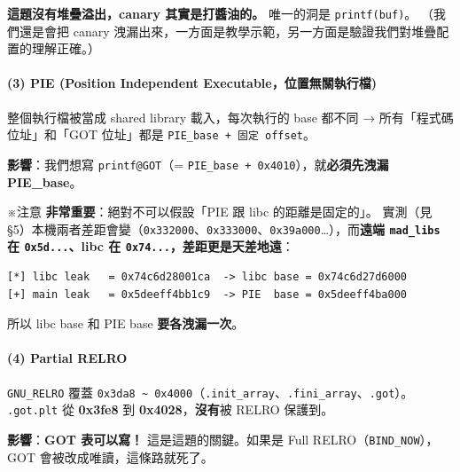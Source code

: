 \documentclass[10pt,a4paper]{article}
\renewenvironment{quote}{%
  \begin{mdframed}[linewidth=0pt,innerleftmargin=0pt,innerrightmargin=0pt,
    innerbottommargin=0pt,innertopmargin=0pt,skipabove=0.55em,skipbelow=0.55em,
    leftmargin=0.9em,rightmargin=0.4em,startcode={\color{quotebar}\vrule width 2.6pt},%
    endcode={}]%
  \itshape\color{black}%
}{%
  \end{mdframed}%
}
\begin{document}
\begin{quote}
\textbf{這題沒有堆疊溢出，canary 其實是打醬油的。} 唯一的洞是
\texttt{printf(buf)}。 （我們還是會把 canary
洩漏出來，一方面是教學示範，另一方面是驗證我們對堆疊配置的理解正確。）
\end{quote}

\paragraph{(3) PIE (Position Independent
Executable，位置無關執行檔)}\label{pie-position-independent-executableux4f4dux7f6eux7121ux95dcux57f7ux884cux6a94}

整個執行檔被當成 shared library 載入，每次執行的 base 都不同 →
所有「程式碼位址」和「GOT 位址」都是
\texttt{PIE\_\allowbreak{}base\ \allowbreak{}+\ \allowbreak{}固定\ \allowbreak{}offset}。

\textbf{影響}：我們想寫 \texttt{printf@GOT}（=
\texttt{PIE\_\allowbreak{}base\ \allowbreak{}+\ \allowbreak{}0x4010}），就\textbf{必須先洩漏 PIE\_base}。

※注意 \textbf{非常重要}：絕對不可以假設「PIE 跟 libc 的距離是固定的」。
實測（見
§5）本機兩者差距會變（\texttt{0x332000}、\texttt{0x333000}、\texttt{0x39a000}\ldots），而\textbf{遠端
\texttt{mad\_\allowbreak{}libs} 在 \texttt{0x5d...}、libc 在
\texttt{0x74...}，差距更是天差地遠}：

\begin{Verbatim}[breaklines=true,breakanywhere=true,breakautoindent=false,fontsize=\fontsize{7.0}{9.5}\selectfont]
[*] libc leak   = 0x74c6d28001ca  -> libc base = 0x74c6d27d6000
[+] main leak   = 0x5deeff4bb1c9  -> PIE  base = 0x5deeff4ba000
\end{Verbatim}

所以 libc base 和 PIE base \textbf{要各洩漏一次}。

\paragraph{(4) Partial RELRO}\label{partial-relro}

\texttt{GNU\_\allowbreak{}RELRO} 覆蓋
\texttt{0x3da8\ \allowbreak{}\textasciitilde{}\allowbreak{}\ \allowbreak{}0x4000}（\texttt{.\allowbreak{}init\_\allowbreak{}array}、\texttt{.\allowbreak{}fini\_\allowbreak{}array}、\texttt{.\allowbreak{}got}）。
\texttt{.\allowbreak{}got.\allowbreak{}plt} 從 \textbf{0x3fe8} 到 \textbf{0x4028}，\textbf{沒有}被
RELRO 保護到。

\textbf{影響}：\textbf{GOT 表可以寫！} 這是這題的關鍵。如果是 Full
RELRO（\texttt{BIND\_\allowbreak{}NOW}），GOT 會被改成唯讀，這條路就死了。
\end{document}
